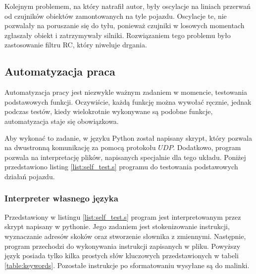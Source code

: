         Kolejnym problemem, na który natrafił autor, były oscylacje na liniach przerwań od czujników obiektów zamontowanych na tyle pojazdu.
        Oscylacje te, nie pozwalały na poruszanie się do tyłu, ponieważ czujniki w losowych momentach zgłaszały obiekt i zatrzymywały silniki.
        Rozwiązaniem tego problemu było zastosowanie filtru RC, który niweluje drgania.



    \subsection{Automatyzacja praca}
        Automatyzacja pracy jest niezwykle ważnym zadaniem w momencie, testowania podstawowych funkcji.
        Oczywiście, każdą funkcję można wywołać ręcznie, jednak podczas testów, kiedy wielokrotnie wykonywane są podobne funkcje, automatyzacja staje się obowiązkowa.

        Aby wykonać to zadanie, w języku Python został napisany skrypt, który pozwala na dwustronną komunikację za pomocą protokołu $UDP$.
        Dodatkowo, program pozwala na interpretację plików, napisanych specjalnie dla tego układu.
        Poniżej przedstawiono listing \eqref{list:self_test.s} programu do testowania podstawowych działań pojazdu.

        

        \subsubsection{Interpreter własnego języka}
            Przedstawiony w listingu \ref{list:self_test.s} program jest interpretowanym przez skrypt napisany w pythonie.
            Jego zadaniem jest stokenizowanie instrukcji, wyznaczanie adresów skoków oraz stworzenie słownika z zmiennymi.
            Następnie, program przechodzi do wykonywania instrukcji zapisanych w pliku.
            Powyższy język posiada tylko kilka prostych słów kluczowych przedstawionych w tabeli \ref{table:keywords}.
            Pozostałe instrukcje po sformatowaniu wysyłane są do malinki.

